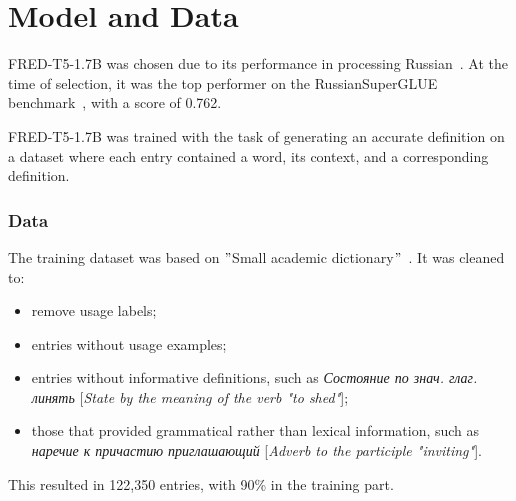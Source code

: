 \documentclass[a0,portrait]{a0poster}
\begin{document}
\begin{multicols}{2}
\begin{center}
\end{center}

\section*{Model and Data}

FRED-T5-1.7B was chosen due to its performance in processing Russian~\cite{FRED-T5}.
At the time of selection, it was the top performer on the RussianSuperGLUE benchmark~\cite{RussianSuperGLUE}, with a score of 0.762.

FRED-T5-1.7B was trained with the task of generating an accurate definition on a dataset
where each entry contained a word, its context, and a corresponding definition.

\subsubsection*{Data}
The training dataset was based on \("\)Small academic dictionary\("\)~\cite{MAS1981}.
It was cleaned to:
\begin{itemize}
    \item remove usage labels;
    \item entries without usage examples;
    \item entries without informative definitions, such as \textit{Состояние по знач. глаг. линять} [\textit{State by the meaning of the verb "to shed"}];
    \item those that provided grammatical rather than lexical information, such as \textit{наречие к причастию приглашающий} [\textit{Adverb to the participle "inviting"}].
\end{itemize}
This resulted in 122,350 entries, with 90\% in the training part.


\end{multicols}
\end{document}
